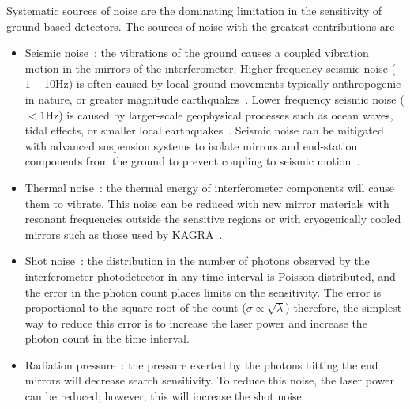 
Systematic sources of noise are the dominating limitation in the sensitivity of ground-based detectors. The sources of noise with the greatest contributions are
%
\begin{itemize}
    \item Seismic noise~\cite{Glanzer:2023}: the vibrations of the ground causes a coupled vibration motion in the mirrors of the interferometer. Higher frequency seismic noise ($1-10$Hz) is often caused by local ground movements typically anthropogenic in nature, or greater magnitude earthquakes~\cite{Nuttall:2018}. Lower frequency seismic noise ($<1$Hz) is caused by larger-scale geophysical processes such as ocean waves, tidal effects, or smaller local earthquakes~\cite{aLIGO:2015}. Seismic noise can be mitigated with advanced suspension systems to isolate mirrors and end-station components from the ground to prevent coupling to seismic motion~\cite{seismic_isolation:2015}.
    \item Thermal noise~\cite{thermal_noise:2018}: the thermal energy of interferometer components will cause them to vibrate. This noise can be reduced with new mirror materials with resonant frequencies outside the sensitive regions or with cryogenically cooled mirrors such as those used by KAGRA~\cite{KAGRA:2021}.
    \item Shot noise~\cite{quantum_noise:2003}: the distribution in the number of photons observed by the interferometer photodetector in any time interval is Poisson distributed, and the error in the photon count places limits on the sensitivity. The error is proportional to the square-root of the count ($\sigma \propto \sqrt{\lambda}$) therefore, the simplest way to reduce this error is to increase the laser power and increase the photon count in the time interval.
    \item Radiation pressure~\cite{quantum_noise:2003}: the pressure exerted by the photons hitting the end mirrors will decrease search sensitivity. To reduce this noise, the laser power can be reduced; however, this will increase the shot noise.
\end{itemize}

